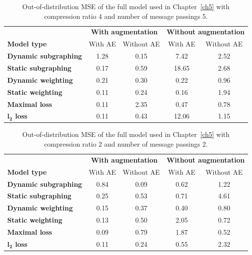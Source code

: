 \documentclass[12pt,a4paper]{report}
\begin{document}
\begin{appendices}
\begin{table}
\centering
\caption{Out-of-distribution MSE of the full model used in Chapter~\ref{ch5} with compression ratio 4 and number of message passings 5.}
\label{table_4_5}
\begin{tabular}{lcccc}
\toprule
 & \multicolumn{2}{c}{\textbf{With augmentation}} & \multicolumn{2}{c}{\textbf{Without augmentation}} \\
 \cmidrule{2-3} \cmidrule{4-5}
\textbf{Model type} & With AE & Without AE & With AE & Without AE \\
\midrule
\textbf{Dynamic subgraphing} & 1.28 & 0.15 & 7.42 & 2.52 \\
\textbf{Static subgraphing} & 0.17 & 0.59 & 18.65 & 2.68 \\
\textbf{Dynamic weighting} & 0.21 & 0.30 & 0.22 & 0.96 \\
\textbf{Static weighting} & 0.11 & 0.24 & 0.16 & 1.94 \\
\textbf{Maximal loss} & 0.11 & 2.35 & 0.47 & 0.78 \\
\textbf{$\boldsymbol{l_2}$ loss} & 0.11 & 0.43 & 12.06 & 1.15 \\
\bottomrule
\end{tabular}
\end{table}

\begin{table}
\centering
\caption{Out-of-distribution MSE of the full model used in Chapter~\ref{ch5} with compression ratio 2 and number of message passings 2.}
\label{table_2_2}
\begin{tabular}{lcccc}
\toprule
 & \multicolumn{2}{c}{\textbf{With augmentation}} & \multicolumn{2}{c}{\textbf{Without augmentation}} \\
 \cmidrule{2-3} \cmidrule{4-5}
\textbf{Model type} & With AE & Without AE & With AE & Without AE \\
\midrule
\textbf{Dynamic subgraphing} & 0.84 & 0.09 & 0.62 & 1.22 \\
\textbf{Static subgraphing} & 0.25 & 0.53 & 0.71 & 4.61 \\
\textbf{Dynamic weighting} & 0.15 & 0.37 & 0.40 & 0.80 \\
\textbf{Static weighting} & 0.13 & 0.50 & 2.05 & 0.72 \\
\textbf{Maximal loss} & 0.09 & 0.79 & 1.87 & 0.52 \\
\textbf{$\boldsymbol{l_2}$ loss} & 0.11 & 0.24 & 0.55 & 2.32 \\
\bottomrule
\end{tabular}
\end{table}


\end{appendices}
\end{document}

